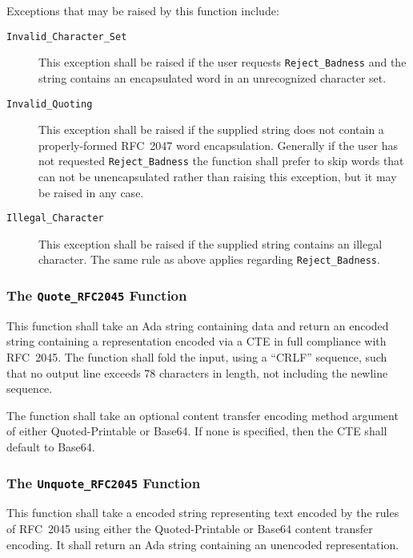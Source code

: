 \documentclass[11pt]{article}
\begin{document}
Exceptions that may be raised by this function include:

\begin{description}

\item[\texttt{Invalid\_Character\_Set}] This exception shall be raised
  if the user requests \texttt{Re\-ject\_Bad\-ness} and the string
  contains an encapsulated word in an unrecognized character set.

\item[\texttt{Invalid\_Quoting}] This exception shall be raised
  if the supplied string does not contain a properly-formed RFC~2047
  word encapsulation. Generally if the user has not requested
  \texttt{Reject\_Badness} the function shall prefer to skip words
  that can not be unencapsulated rather than raising this exception,
  but it may be raised in any case.

\item[\texttt{Illegal\_Character}] This exception shall be raised if
  the supplied string contains an illegal character. The same rule as
  above applies regarding \texttt{Reject\_Badness}.

\end{description}

\subsubsection{The \texttt{Quote\_RFC2045} Function}

This function shall take an Ada string containing data and return an
encoded string containing a representation encoded via a CTE in full
compliance with RFC~2045. The function shall fold the input, using a
``CRLF'' sequence, such that no output line exceeds 78 characters in
length, not including the newline sequence.

The function shall take an optional content transfer encoding method
argument of either Quoted-Printable or Base64. If none is specified,
then the CTE shall default to Base64.

\subsubsection{The \texttt{Unquote\_RFC2045} Function}

This function shall take a encoded string representing text encoded by
the rules of RFC~2045 using either the Quoted-Printable or Base64
content transfer encoding. It shall return an Ada string containing an
unencoded representation.
\end{document}
